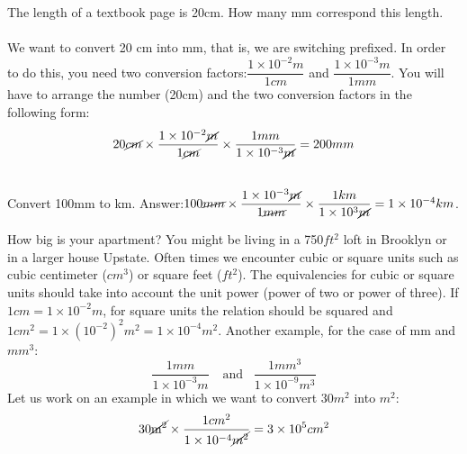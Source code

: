 \documentclass[main.tex]{subfiles}
\begin{document}
\begin{description}
\begin{example} %
The length of a textbook page is 20cm. How many mm correspond this length.\\
\\
 We want to convert 20 cm into mm, that is, we are switching prefixed. In order to do this, you need two conversion factors:$\dfrac{1\times10^{-2}m}{1cm}$ and $\dfrac{1\times10^{-3}m}{1mm}$. You will have to arrange the number (20cm) and the two conversion factors in the following form:
 \begin{equation*}
20\cancel{cm} \times \dfrac{1\times10^{-2}\cancel{m}}{1\cancel{cm}}   \times \dfrac{1mm}{1\times10^{-3}\cancel{m}}       =200mm
\end{equation*}

\faDiamond\ \\
Convert 100mm to km.
\flushright Answer:$100\cancel{mm} \times \dfrac{1\times10^{-3}\cancel{m}}{1\cancel{mm}}   \times \dfrac{1km}{1\times10^{3}\cancel{m}}       =1\times 10^{-4}km$.
\end{example}%



   

   
   





\item[\docfilehook{Square or cubic units}{Square or cubic units}] How big is your apartment? You might be living in a 750$ft^2$ loft in Brooklyn or in a larger house Upstate. Often times we encounter cubic or square units such as cubic centimeter ($cm^3$) or square feet ($ft^2$). The equivalencies for cubic or square units should take into account the unit power (power of two or power of three). 
If $1cm=1\times 10^{-2}m$, for square units the relation should be squared and $1cm^2=1\times (10^{-2})^2m^2=1\times 10^{-4}m^2$. Another example, for the case of mm and $mm^3$:
\begin{equation*}
\boxed{   \frac{1mm}{1\times10^{-3}m}\ \enspace \text{ and  } \enspace \frac{1mm^3}{1\times10^{-9}m^3}}     
\end{equation*}
Let us work on an example in which we want to convert $30m^2$ into $m^2$:
 \begin{equation*}
30\cancel{\text{m}^2} \times \dfrac{1cm^2 }{1\times10^{-4}\cancel{m^2}}=3\times 10^{5}cm^2
\end{equation*}


\end{description}
\end{document}
